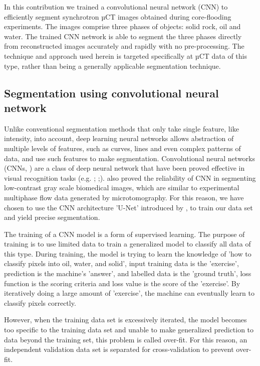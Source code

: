 \documentclass[draft,linenumbers]{agujournal2018}
\begin{document}
In this contribution we trained a convolutional neural network (CNN) to efficiently segment synchrotron µCT images obtained during core-flooding experiments. The images comprise three phases of objects: solid rock, oil and water. The trained CNN network is able to segment the three phases directly from reconstructed images accurately and rapidly with no pre-processing. The technique and approach used herein is targeted specifically at µCT data of this type, rather than being a generally applicable segmentation technique. 

\subsection{Segmentation using convolutional neural network}
Unlike conventional segmentation methods that only take single feature, like intensity, into account, deep learning neural networks allows abstraction of multiple levels of features, such as curves, lines and even complex patterns of data, and use such features to make segmentation. Convolutional neural networks (CNNs, \citet{lecun2015deep}) are a class of deep neural network that have been proved effective in visual recognition tasks (e.g. \citet{krizhevsky2012imagenet}; \citet{long2015fully};\citet{girshick2014rich}). \citet{ronneberger2015u} also proved the reliability of CNN in segmenting low-contrast gray scale biomedical images, which are similar to experimental multiphase flow data generated by microtomography. For this reason, we have chosen to use the CNN architecture 'U-Net' introduced by \citet{ronneberger2015u}, to train our data set and yield precise segmentation.

The training of a CNN model is a form of supervised learning. The purpose of training is to use limited data to train a generalized model to classify all data of this type. During training, the model is trying to learn the knowledge of 'how to classify pixels into oil, water, and solid', input training data is the 'exercise', prediction is the machine's 'answer', and labelled data is the 'ground truth', loss function is the scoring criteria and loss value is the score of the 'exercise'. By iteratively doing a large amount of 'exercise', the machine can eventually learn to classify pixels correctly.

However, when the training data set is excessively iterated, the model becomes too specific to the training data set and unable to make generalized prediction to data beyond the training set, this problem is called over-fit. For this reason, an independent validation data set is separated for cross-validation to prevent over-fit.
\end{document}
